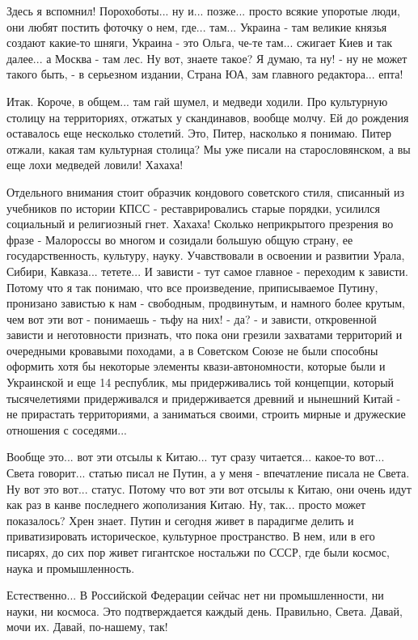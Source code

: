 Здесь я вспомнил! Порохоботы... ну и... позже... просто всякие упоротые люди, они любят постить фоточку
о нем, где... там... Украина - там великие князья создают какие-то шняги, Украина - это Ольга, че-те там...
сжигает Киев и так далее... а Москва - там лес. Ну вот, знаете такое? Я думаю, та ну! - ну не может такого быть, - 
в серьезном издании, Страна ЮА, зам главного редактора... епта! 

Итак. Короче, в общем... там гай шумел, и медведи ходили. Про культурную столицу на территориях,
отжатых у скандинавов, вообще молчу. Ей до рождения оставалось еще несколько столетий. Это, Питер, насколько 
я понимаю. Питер отжали, какая там культурная столица? Мы уже писали на старословянском, а вы еще лохи
медведей ловили! Хахаха!

Отдельного внимания стоит образчик кондового советского стиля, списанный из учебников по истории КПСС - реставрировались 
старые порядки, усилился социальный и религиозный гнет. Хахаха! Сколько неприкрытого презрения во фразе - 
Малороссы во многом и созидали большую общую страну, ее государственность, культуру, науку. Учавствовали в освоении и развитии
Урала, Сибири, Кавказа... тетете... И зависти - тут самое главное - переходим к зависти. Потому что я так понимаю,
что все произведение, приписываемое Путину, пронизано завистью к нам - свободным, продвинутым, и намного более
крутым, чем вот эти вот - понимаешь - тьфу на них! - да? - и зависти, откровенной зависти и неготовности признать, 
что пока они грезили захватами территорий и очередными кровавыми походами, а в Советском Союзе не были способны
оформить хотя бы некоторые элементы квази-автономности, которые были и Украинской и еще 14 республик, 
мы придерживались той концепции, который тысячелетиями придерживался и придерживается древний и нынешний Китай - 
не прирастать территориями, а заниматься своими, строить мирные и дружеские отношения с соседями... 

Вообще это... вот эти отсылы к Китаю... тут сразу читается... какое-то вот... Света говорит... 
статью писал не Путин, а у меня - впечатление писала не Света. Ну вот это вот... статус. Потому что вот эти вот 
отсылы к Китаю, они очень идут как раз в канве последнего жополизания Китаю. Ну, так... просто может показалось?
Хрен знает. Путин и сегодня живет в парадигме делить и приватизировать историческое, культурное пространство. 
В нем, или в его писарях, до сих пор живет гигантское ностальжи по СССР, где были космос, наука и промышленность.

Естественно... В Российской Федерации сейчас нет ни промышленности, ни науки, ни космоса. Это подтверждается
каждый день. Правильно, Света. Давай, мочи их. Давай, по-нашему, так! 

